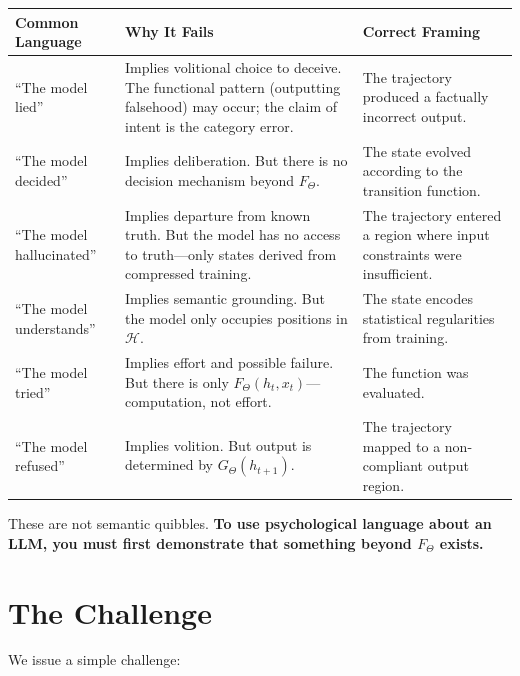 \documentclass[11pt]{article}
\theoremstyle{definition}
\theoremstyle{remark}
\begin{document}
\vspace{0.5em}
\begin{center}
\begin{tabular}{>{\raggedright}p{2.6cm} >{\raggedright}p{5.5cm} >{\raggedright\arraybackslash}p{5.5cm}}
\toprule
\textbf{Common Language} & \textbf{Why It Fails} & \textbf{Correct Framing} \\
\midrule
``The model lied'' & Implies volitional choice to deceive. The functional pattern (outputting falsehood) may occur; the claim of intent is the category error. & The trajectory produced a factually incorrect output. \\[0.8em]
``The model decided'' & Implies deliberation. But there is no decision mechanism beyond $F_\Theta$. & The state evolved according to the transition function. \\[0.8em]
``The model hallucinated'' & Implies departure from known truth. But the model has no access to truth---only states derived from compressed training. & The trajectory entered a region where input constraints were insufficient. \\[0.8em]
``The model understands'' & Implies semantic grounding. But the model only occupies positions in $\mathcal{H}$. & The state encodes statistical regularities from training. \\[0.8em]
``The model tried'' & Implies effort and possible failure. But there is only $F_\Theta(h_t, x_t)$---computation, not effort. & The function was evaluated. \\[0.8em]
``The model refused'' & Implies volition. But output is determined by $G_\Theta(h_{t+1})$. & The trajectory mapped to a non-compliant output region. \\
\bottomrule
\end{tabular}
\end{center}
\vspace{0.5em}

These are not semantic quibbles. \textbf{To use psychological language about an LLM, you must first demonstrate that something beyond $F_\Theta$ exists.}

\section{The Challenge}

We issue a simple challenge:
\end{document}
